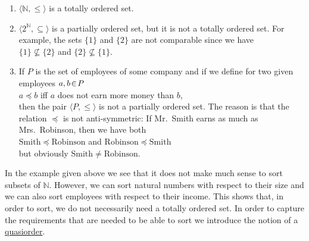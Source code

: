 \examples
\begin{enumerate}
\item $\langle\mathbb{N}, \leq \rangle$ is a totally ordered set.
\item $\langle 2^{\mathbb{N}}, \subseteq \rangle$ is a partially ordered set, but it is not a totally
      ordered set.  For example, the sets $\{1\}$ and $\{2\}$ are not comparable since we have
      \\[0.2cm]
      \hspace*{1.3cm}
      $\{1\} \not\subseteq \{2\}$ \quad and \quad  $\{2\} \not\subseteq \{1\}$.
\item If $P$ is the set of employees of some company and if we define for two given employees
      $a,b \!\in\! P$
      \\[0.2cm]
      \hspace*{1.3cm}
      $a \preceq b$ \quad iff \quad  $a$ does not earn more money than $b$, 
      \\[0.2cm]
      then the pair $\langle P, \leq \rangle$ is not a partially ordered set.  The reason is that
      the relation $\preceq$ is not anti-symmetric:  If Mr.~Smith earns as much as
      Mrs.~Robinson, then we have both
      \\[0.2cm]
      \hspace*{1.3cm}
      $\mathrm{Smith} \preceq \mathrm{Robinson}$ \quad and \quad $\mathrm{Robinson} \preceq \mathrm{Smith}$
      \\[0.2cm]
      but obviously $\mathrm{Smith} \not= \mathrm{Robinson}$.
\end{enumerate}
In the example given above we see that it does not make much sense to sort subsets of $\mathbb{N}$.
However, we can sort natural numbers with respect to their size and we can also sort employees with
respect to their income.  This shows that, in order to sort,  we do not necessarily need a totally
ordered set.  In order to capture the requirements that are needed to be able to sort we introduce
the notion of a \href{http://en.wikipedia.org/wiki/Preorder}{quasiorder}.
\pagebreak

